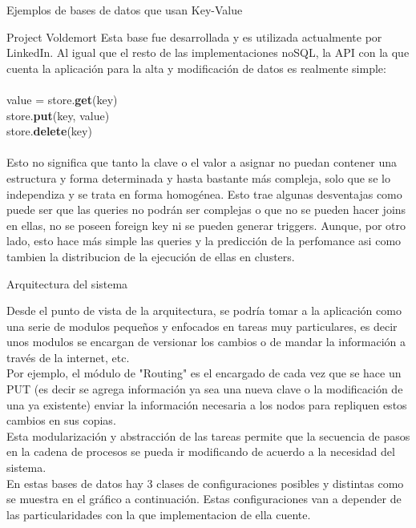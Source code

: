 \begin{section}{Ejemplos de bases de datos que usan Key-Value}
\begin{subsection}{Project Voldemort}
Esta base fue desarrollada y es utilizada actualmente por LinkedIn. Al igual que el resto de las implementaciones noSQL, la API con la que cuenta la aplicación para la alta y modificación de datos es realmente simple:\\
\\
value = store.\textbf{get}(key) \\
store.\textbf{put}(key, value) \\
store.\textbf{delete}(key) \\
\\
Esto no significa que tanto la clave o el valor a asignar no puedan contener una estructura y forma determinada y hasta bastante más compleja, solo que se lo independiza y se trata en forma homogénea. Esto trae algunas desventajas como puede ser que las queries no podrán ser complejas o que no se pueden hacer joins en ellas, no se poseen foreign key ni se pueden generar triggers. Aunque, por otro lado, esto hace más simple las queries y la predicción de la perfomance asi como tambien la distribucion de la ejecución de ellas en clusters. \\

\begin{subsubsection}{Arquitectura del sistema}

Desde el punto de vista de la arquitectura, se podría tomar a la aplicación como una serie de modulos pequeños y enfocados en tareas muy particulares, es decir unos modulos se encargan de versionar los cambios o de mandar la información a través de la internet, etc. \\

Por ejemplo, el módulo de "Routing" es el encargado de cada vez que se hace un PUT (es decir se agrega información ya sea una nueva clave o la modificación de una ya existente) enviar la información necesaria a los nodos para repliquen estos cambios en sus copias.\\

Esta modularización y abstracción de las tareas permite que la secuencia de pasos en la cadena de procesos se pueda ir modificando de acuerdo a la necesidad del sistema. \\

En estas bases de datos hay 3 clases de configuraciones posibles y distintas como se muestra en el gráfico a continuación. Estas configuraciones van a depender de las particularidades con la que implementacion de ella cuente.\\


\end{subsubsection}
\end{subsection}
\end{section}
